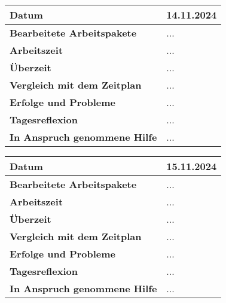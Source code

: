 \begin{longtable}{p{}|p{}}
	\hline
	\textbf{Datum}                       & 14.11.2024 \\
	\hline
	\textbf{Bearbeitete Arbeitspakete}   & ... \\
	\hline
	\textbf{Arbeitszeit}                 & ... \\
	\hline
	\textbf{Überzeit}                    & ... \\
	\hline
	\textbf{Vergleich mit dem Zeitplan}  & ... \\
	\hline
	\textbf{Erfolge und Probleme}        & ...
	\\
	\hline
	\textbf{Tagesreflexion}              & ...
	\\
	\hline
	\textbf{In Anspruch genommene Hilfe} & ... \\
	\hline
\end{longtable}\label{tab:arbeitsprotokoll-tag6}
\newpage

\begin{longtable}{p{}|p{}}
	\hline
	\textbf{Datum}                       & 15.11.2024 \\
	\hline
	\textbf{Bearbeitete Arbeitspakete}   & ... \\
	\hline
	\textbf{Arbeitszeit}                 & ... \\
	\hline
	\textbf{Überzeit}                    & ... \\
	\hline
	\textbf{Vergleich mit dem Zeitplan}  & ... \\
	\hline
	\textbf{Erfolge und Probleme}        & ...
	\\
	\hline
	\textbf{Tagesreflexion}              & ...
	\\
	\hline
	\textbf{In Anspruch genommene Hilfe} & ... \\
	\hline
\end{longtable}\label{tab:arbeitsprotokoll-tag7}
\newpage


